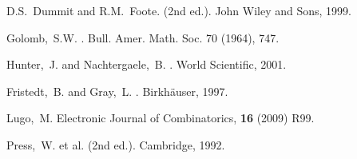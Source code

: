 \begin{thebibliography}{}

D.S.~Dummit and R.M.~Foote.
 (2nd ed.).
\newblock John Wiley and Sons, 1999.

Golomb,~S.W.
.
\newblock Bull. Amer. Math. Soc. 70 (1964), 747.

Hunter,~J. and Nachtergaele,~B.
.
\newblock World Scientific, 2001.

Fristedt,~B. and Gray,~L.
.
\newblock Birkh\"auser, 1997.

Lugo,~M.
\newblock Electronic Journal of Combinatorics, \textbf{16} (2009) R99.

Press,~W. et al.
 (2nd ed.).
\newblock Cambridge, 1992.

\end{thebibliography}
